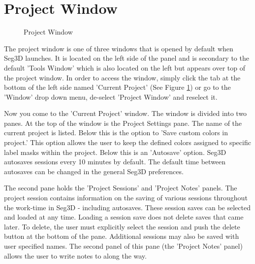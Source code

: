 \documentclass[fleqn,11pt,openany]{book}
\begin{document}
\section{Project Window}

\begin{figure}
\caption{Project Window}\label{fig:ProjectWindow}
\end{figure}
The project window is one of three windows that is opened by default when Seg3D launches.  
It is located on the left side of the panel and is secondary to the default 'Tools Window' which is also 
located on the left but appears over top of the project window.  
In order to access the window, simply click the tab at the bottom of the left side named 'Current Project' (See Figure \ref{fig:ProjectWindow}) or go to the 'Window' drop down menu, de-select 
'Project Window' and reselect it.

Now you come to the 'Current Project' window.  
The window is divided into two panes.  
At the top of the window is the Project Settings pane.  
The name of the current project is listed.  
Below this is the option to 'Save custom colors in project.'  
This option allows the user to keep the defined colors assigned to specific label masks within the project.  
Below this is an 'Autosave' option. Seg3D autosaves sessions every 10 minutes by default.  
The default time between autosaves can be changed in the general Seg3D preferences.

The second pane holds the 'Project Sessions' and 'Project Notes' panels.  
The project session contains information on the saving of various sessions throughout the work-time in Seg3D - including autosaves.  
These session saves can be selected and loaded at any time.  
Loading a session save does not delete saves that came later.  
To delete, the user must explicitly select the session and push the delete button at the bottom of the pane.  
Additional sessions may also be saved with user specified names.  
The second panel of this pane (the 'Project Notes' panel) allows the user to write notes to along the way.
\end{document}
